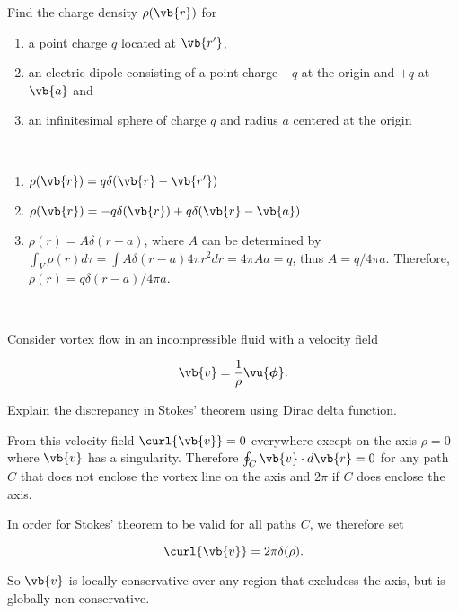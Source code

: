 \documentclass[english,a4paper,12pt]{report}
\begin{document}
	
{Find the charge density \(\rho(\vb{r})\) for
\begin{enumerate}
	\item a point charge  \(q\) located at \(\vb{r'}\),\\
	\item an electric dipole consisting of a point charge \(-q\) at the origin and \(+q\) at \(\vb{a}\) and\\
	\item an infinitesimal sphere of charge \(q\) and radius \(a\) centered at the origin
\end{enumerate}~}
{\begin{enumerate}
	\item \(\rho(\vb{r}) = q\delta(\vb{r} - \vb{r'}) \)\\

	\item \(\rho(\vb{r}) = -q\delta(\vb{r}) + q\delta(\vb{r} - \vb{a})\)\\	

	\item \(\rho(r) = A\delta(r - a)\), where \(A\) can be determined by \(\int_{V} \rho(r) d\tau = \int A\delta(r-a) 4\pi r^2 dr = 4\pi Aa = q\), thus \(A = q /4\pi a\). Therefore, \(\rho(r) = q\delta(r - a) /4\pi a\).
\end{enumerate}~}

{Consider vortex flow in an incompressible fluid with a velocity field

\begin{equation}
	\vb{v} = \frac{1}{\rho } \vu{\boldsymbol{\phi } }. 
\end{equation}

Explain the discrepancy in Stokes' theorem using Dirac delta function.
}
{From this velocity field \(\curl{\vb{v} } =0\) everywhere except on the axis \(\rho =0\) where \(\vb{v}\) has a singularity. Therefore \( \oint_{C} \vb{v} \cdot d\vb{r} =0\) for any path \(C\) that does not enclose the vortex line on the axis and \(2\pi \) if \(C\) does enclose the axis.

In order for Stokes' theorem to be valid for all paths \(C\), we therefore set 

\begin{equation}
	\curl{\vb{v} } = 2\pi \delta (\rho ).
\end{equation}

So \(\vb{v} \) is locally conservative over any region that excludess the axis, but is globally non-conservative. 

} 
\end{document}
